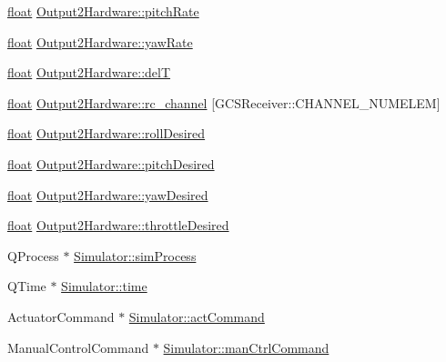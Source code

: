 \begin{DoxyCompactItemize}
\item 
\hyperlink{_super_l_u_support_8h_a6a1bb6ed41f44b60e7bd83b0e9945aa7}{float} \hyperlink{group___h_i_t_l_plugin_ga9d3248d73390ba0b13ca165ee1f1fef0}{Output2\-Hardware\-::pitch\-Rate}
\item 
\hyperlink{_super_l_u_support_8h_a6a1bb6ed41f44b60e7bd83b0e9945aa7}{float} \hyperlink{group___h_i_t_l_plugin_gab54300de73ca6f11f519068435673210}{Output2\-Hardware\-::yaw\-Rate}
\item 
\hyperlink{_super_l_u_support_8h_a6a1bb6ed41f44b60e7bd83b0e9945aa7}{float} \hyperlink{group___h_i_t_l_plugin_gadbdb09f62a5ce0e914e8551ce3bd0bbd}{Output2\-Hardware\-::del\-T}
\item 
\hyperlink{_super_l_u_support_8h_a6a1bb6ed41f44b60e7bd83b0e9945aa7}{float} \hyperlink{group___h_i_t_l_plugin_gadf58977eef899196280267ae39cc6f65}{Output2\-Hardware\-::rc\-\_\-channel} \mbox{[}G\-C\-S\-Receiver\-::\-C\-H\-A\-N\-N\-E\-L\-\_\-\-N\-U\-M\-E\-L\-E\-M\mbox{]}
\item 
\hyperlink{_super_l_u_support_8h_a6a1bb6ed41f44b60e7bd83b0e9945aa7}{float} \hyperlink{group___h_i_t_l_plugin_ga56fde0222228b19a5ed9e89efd765da0}{Output2\-Hardware\-::roll\-Desired}
\item 
\hyperlink{_super_l_u_support_8h_a6a1bb6ed41f44b60e7bd83b0e9945aa7}{float} \hyperlink{group___h_i_t_l_plugin_ga29bbb9f720db0b7039f92a3afcb785a3}{Output2\-Hardware\-::pitch\-Desired}
\item 
\hyperlink{_super_l_u_support_8h_a6a1bb6ed41f44b60e7bd83b0e9945aa7}{float} \hyperlink{group___h_i_t_l_plugin_gaf01c33ffb5c7695348739d0070122bd7}{Output2\-Hardware\-::yaw\-Desired}
\item 
\hyperlink{_super_l_u_support_8h_a6a1bb6ed41f44b60e7bd83b0e9945aa7}{float} \hyperlink{group___h_i_t_l_plugin_gab6902f4f38e771b9d499521d861661f2}{Output2\-Hardware\-::throttle\-Desired}
\item 
Q\-Process $\ast$ \hyperlink{group___h_i_t_l_plugin_ga28f5833f779eb659394e6c6cfe6f2331}{Simulator\-::sim\-Process}
\item 
Q\-Time $\ast$ \hyperlink{group___h_i_t_l_plugin_ga162228fbfec7737c989bfe0b340e8617}{Simulator\-::time}
\item 
Actuator\-Command $\ast$ \hyperlink{group___h_i_t_l_plugin_ga9362d7e2619934460d6f8070496d336f}{Simulator\-::act\-Command}
\item 
Manual\-Control\-Command $\ast$ \hyperlink{group___h_i_t_l_plugin_ga1af06e35c7befb4f3ffd0bfee9a6efc2}{Simulator\-::man\-Ctrl\-Command}
\item 

\end{DoxyCompactItemize}
